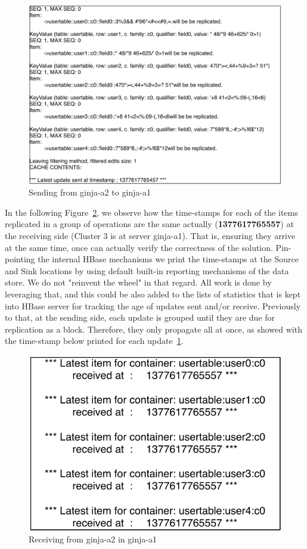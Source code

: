 
\begin{figure}
\centering
\includegraphics[scale=0.6]{figs/ginja2-grouping-send.pdf}
\caption{Sending from ginja-a2 to ginja-a1}
\label{fig-shipping-grouping}
\end{figure}

In the following Figure~\ref{fig-receiving-grouping}, we observe how the time-stamps for each of the items replicated in a group of operations are the same actually (\textbf{1377617765557}) at the receiving side (Cluster 3 is at server ginja-a1). That is, ensuring they arrive at the same time, once can actually verify the correctness of the solution. Pin-pointing the internal HBase mechanisms we print the time-stamps at the Source and Sink locations by using default built-in reporting mechanisms of the data store. We do not "reinvent the wheel" in that regard. All work is done by leveraging that, and this could be also added to the lists of statistics that is kept into HBase server for tracking the age of updates sent and/or receive. Previously to that, at the sending side, each update is grouped until they are due for replication as a block. Therefore, they only propagate all at once, as showed with the time-stamp below printed for each update~\ref{fig-shipping-grouping}.

\begin{figure}
\centering
\includegraphics[scale=.6]{figs/ginja1-grouping-receive.pdf}
\caption{Receiving from ginja-a2 in ginja-a1}
\label{fig-receiving-grouping}
\end{figure}
